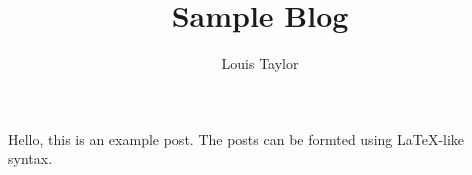 

\title{Sample Blog}
\author{Louis Taylor}
\maketitle

    Hello, this is an example post. The posts can be formted using LaTeX-like
    syntax.


